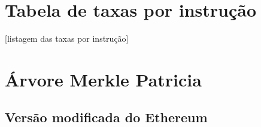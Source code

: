 \documentclass[tcc,capa]{texufpel}
\begin{document}

 

%

\annex
\chapter{Tabela de taxas por instrução}\label{annx:taxas-por-instrução}

[listagem das taxas por instrução]

\chapter{Árvore Merkle Patricia}\label{annx:arvore-merkle-patricia}

\section{Versão modificada do Ethereum}
\end{document}
